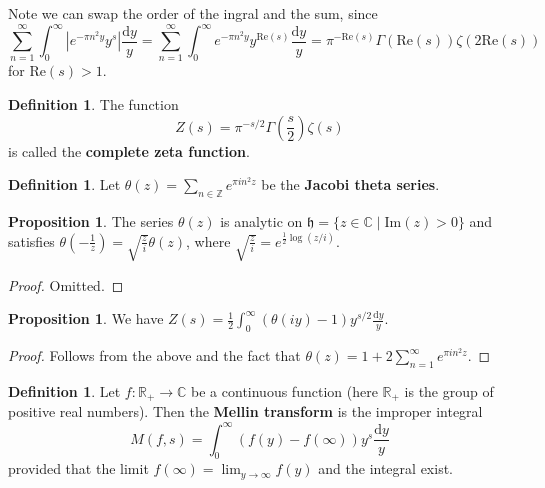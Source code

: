 \documentclass{article}
\theoremstyle{definition}
\newtheorem{prop}[theorem]{Proposition}
\newtheorem{defn}[theorem]{Definition}
\begin{document}
Note we can swap the order of the ingral and the sum, since \[
\sum_{n=1}^{\infty} \int_{0}^{\infty} \left|e^{-\pi n^2 y}y^s\right|\frac{\mathrm{d}y}{y} = \sum_{n=1}^{\infty} \int_{0}^{\infty} e^{-\pi n^2 y}y^{\text{Re}(s)}\frac{\mathrm{d}y}{y} = \pi^{-\text{Re}(s)}\Gamma(\text{Re}(s))\zeta(2\text{Re}(s))
\]
for $\text{Re}(s)>1$.
\begin{defn}\label{defn2.13}
    The function \[
    Z(s) = \pi^{-s/2}\Gamma \left(\frac{s}{2}\right) \zeta(s)
    \]
    is called the \textbf{complete zeta function}.
\end{defn}
\begin{defn}\label{defn2.14}
    Let $\theta(z) = \sum_{n \in \mathbb{Z}} e^{\pi i n^2 z}$ be the \textbf{Jacobi theta series}.
\end{defn}
\begin{prop}\label{prop2.15}
    The series $\theta(z)$ is analytic on $\mathfrak{h} = \{z \in \mathbb{C} \mid \text{Im}(z)>0\}$ and satisfies $\theta \left(-\frac{1}{z}\right) = \sqrt{\frac{z}{i}}\theta(z)$, where $\sqrt{\frac{z}{i}} = e^{\frac{1}{2}\log(z/i)}$.
\end{prop}
\begin{proof}
    Omitted.
\end{proof}
\begin{prop}\label{prop2.16}
    We have $Z(s) = \frac{1}{2}\int_{0}^{\infty} \left(\theta(iy)-1\right) y^{s/2} \frac{\mathrm{d}y}{y}$.
\end{prop}
\begin{proof}
    Follows from the above and the fact that $\theta(z) = 1 + 2 \sum_{n=1}^{\infty} e^{\pi i n^2 z}$.
\end{proof}
\begin{defn}\label{defn2.17}
    Let $f : \mathbb{R}_+ \to \mathbb{C}$ be a continuous function (here $\mathbb{R}_+$ is the group of positive real numbers). Then the \textbf{Mellin transform} is the improper integral \[
    M(f,s) = \int_{0}^{\infty} (f(y)-f(\infty))y^s \frac{\mathrm{d}y}{y} 
    \]
    provided that the limit $f(\infty) = \lim_{y \to \infty}f(y)$ and the integral exist.
\end{defn}
\end{document}
